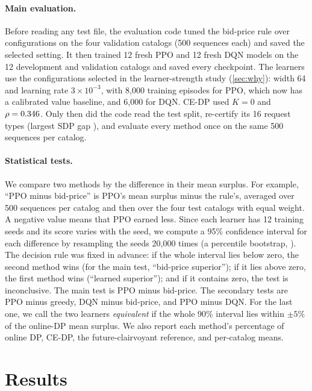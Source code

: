 \documentclass[10pt]{article}
\begin{document}
\paragraph{Main evaluation.} Before reading any test file, the evaluation code tuned the bid-price rule over \bpConfigs{} configurations on the four validation catalogs (500 sequences each) and saved the selected setting. It then trained 12 fresh PPO and 12 fresh DQN models on the 12 development and validation catalogs and saved every checkpoint. The learners use the configurations selected in the learner-strength study (\cref{sec:why}): width 64 and learning rate $3\times10^{-3}$, with 8{,}000 training episodes for PPO, which now has a calibrated value baseline, and 6{,}000 for DQN. CE-DP used $K=0$ and $\rho=0.346$. Only then did the code read the test split, re-certify its 16 request types (largest SDP gap \cfSdpMax), and evaluate every method once on the same 500 sequences per catalog.

\paragraph{Statistical tests.} We compare two methods by the difference in their mean surplus. For example, ``PPO minus bid-price'' is PPO's mean surplus minus the rule's, averaged over 500 sequences per catalog and then over the four test catalogs with equal weight. A negative value means that PPO earned less. Since each learner has 12 training seeds and its score varies with the seed, we compute a 95\% confidence interval for each difference by resampling the seeds 20{,}000 times (a percentile bootstrap, \citealp{efron1993introduction}). The decision rule was fixed in advance: if the whole interval lies below zero, the second method wins (for the main test, ``bid-price superior''); if it lies above zero, the first method wins (``learned superior''); and if it contains zero, the test is inconclusive. The main test is PPO minus bid-price. The secondary tests are PPO minus greedy, DQN minus bid-price, and PPO minus DQN. For the last one, we call the two learners \emph{equivalent} if the whole 90\% interval lies within $\pm5\%$ of the online-DP mean surplus. We also report each method's percentage of online DP, CE-DP, the future-clairvoyant reference, and per-catalog means.

\section{Results}\label{sec:results}
\end{document}
